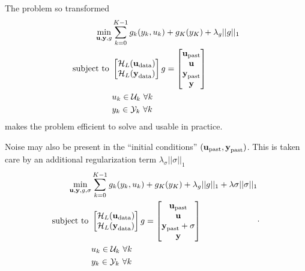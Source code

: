 The problem so transformed
\begin{equation*}
  \begin{aligned}
    \min_{\boldsymbol{\mathrm{u}},\boldsymbol{\mathrm{y}},g} & \sum_{k=0}^{K-1} g_k(y_k,u_k) + g_K(y_K) + \lambda_g||g||_1 \\
    \textrm{subject to } &  \begin{bmatrix}
                              \mathcal{H}_L(\boldsymbol{\mathrm{u}}_\textrm{data}) \\
                              \mathcal{H}_L(\boldsymbol{\mathrm{y}}_\textrm{data})
                            \end{bmatrix}g =
                           \begin{bmatrix}
                             \boldsymbol{\mathrm{u}}_\textrm{past} \\ \boldsymbol{\mathrm{u}} \\ \boldsymbol{\mathrm{y}}_\textrm{past} \\ \boldsymbol{\mathrm{y}}
                           \end{bmatrix} \\
                       & u_k \in \mathcal{U}_k\ \forall k \\
                       & y_k \in \mathcal{Y}_k\ \forall k
  \end{aligned}
\end{equation*}
makes the problem efficient to solve and usable in practice.

Noise may also be present in the ``initial conditions'' $(\boldsymbol{\mathrm{u}}_\textrm{past},\boldsymbol{\mathrm{y}}_\textrm{past})$. This is taken care by an additional regularization term $\lambda_\sigma ||\sigma||_1$
\begin{equation*}
  \begin{aligned}
    \min_{\boldsymbol{\mathrm{u}},\boldsymbol{\mathrm{y}},g,\sigma} & \sum_{k=0}^{K-1} g_k(y_k,u_k) + g_K(y_K) + \lambda_g||g||_1 + \lambda\sigma ||\sigma||_1\\
    \textrm{subject to } &  \begin{bmatrix}
                              \mathcal{H}_L(\boldsymbol{\mathrm{u}}_\textrm{data}) \\
                              \mathcal{H}_L(\boldsymbol{\mathrm{y}}_\textrm{data})
                            \end{bmatrix}g =
                           \begin{bmatrix}
                             \boldsymbol{\mathrm{u}}_\textrm{past} \\ \boldsymbol{\mathrm{u}} \\ \boldsymbol{\mathrm{y}}_\textrm{past}+\sigma \\ \boldsymbol{\mathrm{y}}
                           \end{bmatrix} \\
                       & u_k \in \mathcal{U}_k\ \forall k \\
                       & y_k \in \mathcal{Y}_k\ \forall k
  \end{aligned}.
\end{equation*}

